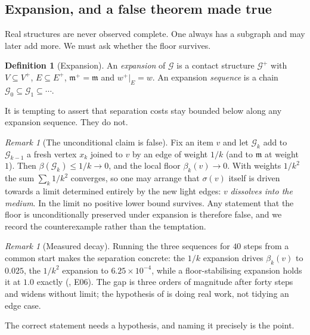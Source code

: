 \documentclass[11pt,twocolumn,a4paper]{article}
\theoremstyle{plain}
\theoremstyle{definition}
\newtheorem{definition}[theorem]{Definition}
\theoremstyle{remark}
\newtheorem{remark}[theorem]{Remark}
\newcommand{\flo}{\beta}                       %
\newcommand{\sep}{\sigma}                      %
\newcommand{\med}{\mathfrak{m}}                %
\newcommand{\Gph}{\mathcal{G}}
\newcommand{\Ver}{V}
\newcommand{\Edg}{E}
\newcommand{\weight}{w}
\begin{document}
\subsection{Expansion, and a false theorem made true}

Real structures are never observed complete. One always has a subgraph
and may later add more. We must ask whether the floor survives.

\begin{definition}[Expansion]
\label{def:expansion}
An \emph{expansion} of $\Gph$ is a contact structure $\Gph^+$ with
$\Ver\subseteq\Ver^+$, $\Edg\subseteq\Edg^+$, $\med^+=\med$ and
$\weight^+|_\Edg=\weight$. An expansion \emph{sequence} is a chain
$\Gph_0\subseteq\Gph_1\subseteq\cdots$.
\end{definition}

It is tempting to assert that separation costs stay bounded below along
any expansion sequence. They do not.

\begin{remark}[The unconditional claim is false]
\label{rem:not-positive}
Fix an item $v$ and let $\Gph_k$ add to $\Gph_{k-1}$ a fresh vertex
$x_k$ joined to $v$ by an edge of weight $1/k$ (and to $\med$ at weight
$1$). Then $\flo(\Gph_k)\le 1/k\to 0$, and the local floor
$\flo_k(v)\to 0$. With weights $1/k^2$ the sum $\sum_k 1/k^2$ converges,
so one may arrange that $\sep(v)$ itself is driven towards a limit
determined entirely by the new light edges: $v$ \emph{dissolves into the
medium}. In the limit no positive lower bound survives. Any statement
that the floor is unconditionally preserved under expansion is therefore
false, and we record the counterexample rather than the temptation.
\end{remark}

\begin{remark}[Measured decay]
\label{rem:decaymeasured}
Running the three sequences for $40$ steps from a common start makes the
separation concrete: the $1/k$ expansion drives $\flo_k(v)$ to
$0.025$, the $1/k^2$ expansion to $6.25\times10^{-4}$, while a
floor-stabilising expansion holds it at $1.0$ exactly
(, E06). The gap is three orders of magnitude after
forty steps and widens without limit; the hypothesis of
 is doing real work, not tidying an edge case.
\end{remark}

The correct statement needs a hypothesis, and naming it precisely is the
point.
\end{document}

